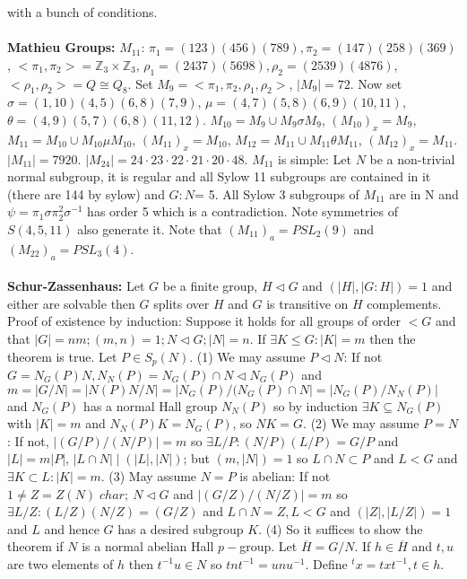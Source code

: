 with a bunch of conditions.\\
\\
{\bf Mathieu Groups:}
$M_{11}$: $\pi_1= (123)(456)(789), \pi_2= (147)(258)(369)$,
$<\pi_1, \pi_2>= {\mathbb Z}_3 \times {\mathbb Z}_3$, 
$\rho_1= (2437)(5698), \rho_2= (2539)(4876)$, $<\rho_1 , \rho_2> = Q \cong Q_8$.  Set
$M_9= <\pi_1 , \pi_2 , \rho_1 , \rho_2>$, $|M_9|=72$.  
Now set $\sigma= (1, 10)(4,5)(6,8)(7,9)$, $\mu= (4,7)(5,8) (6,9) (10,11)$,
$\theta= (4,9) (5,7) (6,8)(11,12)$.  
$M_{10}= M_9 \cup M_9 \sigma M_9$,  $(M_{10})_x= M_{9}$,
$M_{11}= M_{10} \cup M_{10} \mu M_{10}$,  $(M_{11})_x= M_{10}$,
$M_{12}= M_{11} \cup M_{11} \theta M_{11}$,  $(M_{12})_x= M_{11}$.  $|M_{11}|=7920$.
$|M_{24}|= 24 \cdot 23 \cdot 22 \cdot 21 \cdot 20 \cdot 48 $.  $M_{11}$ is simple:
Let $N$ be a non-trivial normal subgroup, it is regular and all Sylow 11 subgroups
are contained in it (there are 144 by sylow) and $G:N$= 5.  All Sylow 3 subgroups
of $M_{11}$ are in N and $\psi= \pi_1 \sigma \pi_2^2 \sigma^{-1}$ has order 5 which is a
contradiction.  Note symmetries of $S(4,5,11)$ also generate it.  Note that $(M_{11})_a= PSL_2(9)$
and $(M_{22})_a = PSL_3(4)$.\\
\\
{\bf Schur-Zassenhaus:}
Let $G$ be a finite group, $H \lhd G$ and $(|H|, |G:H|)=1$ and either are
solvable then $G$ splits over $H$ and $G$ is transitive on $H$ complements.
Proof of existence
by induction:  Suppose it holds for all groups of order $<G$ and that $|G|=nm;
(m,n)=1; N \lhd G; |N|= n$.  If $\exists K \le G: |K|=m$ then the theorem is true.
Let $P \in S_p(N)$.  (1) We may assume $P \lhd N$:  If not 
$G=N_G(P)N, N_N(P)=N_G(P) \cap N \lhd N_G(P)$ and 
$m=|G/N|=|N(P)N/N|=|N_G (P)/(N_G (P) \cap N|= |N_G(P)/N_N(P)|$ and $N_G(P)$ has a
normal Hall group $N_N(P)$ so by induction $\exists K \subseteq N_G(P)$ with
$|K|=m$ and $N_N(P)K=N_G(P)$, so $NK=G$. (2) We may assume $P=N$: If not,
$|(G/P)/(N/P)|=m$ so $\exists L/P: (N/P)(L/P)= G/P$ and 
$|L|=m |P|$, $|L \cap N| \mid (|L|, |N|)$;
but $(m, |N|)=1$ so $L \cap N \subset P$ and $L<G$ and $\exists K \subset L: |K|=m$.
(3) May assume $N=P$ is abelian:  If not $1 \ne Z=Z(N) \; char ;\ N \lhd G$ and
$|(G/Z)/(N/Z)|=m$ so $\exists L/Z: (L/Z)(N/Z)=(G/Z)$ and $L \cap N =Z, L < G$ and
$(|Z|, |L/Z|)=1$ and $L$ and hence $G$ has a desired subgroup $K$.
(4) So it suffices to show the theorem if $N$ is a normal abelian Hall $p-$group.
Let ${\overline H}= G/N$.  If $h \in {\overline H}$ and $t , u$ are two elements of
$h$ then $t^{-1}u \in N$ so $tnt^{-1}=unu^{-1}$.  Define $^tx=txt^{-1}, t \in h$.
